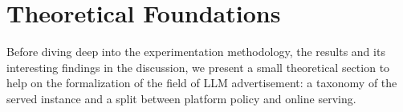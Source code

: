 \documentclass[english]{article}
\begin{document}
\section{Theoretical Foundations}
\label{sec:theoretical-foundations}

Before diving deep into the experimentation methodology, the results and its interesting findings in the discussion, we present a small theoretical section to help on the formalization of the field of LLM advertisement: a taxonomy of the served instance and a split between platform policy and online serving.
\\

\end{document}
